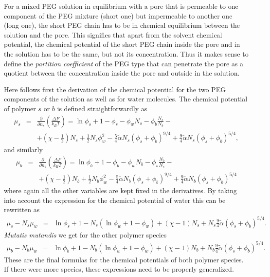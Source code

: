 \documentclass[11pt,a4paper]{article}
\begin{document}
For a mixed PEG solution in equilibrium with a pore that is permeable to one component of the PEG mixture (short one) but impermeable to another one (long one), the short PEG chain has to be in chemical equilibrium between the solution and the pore. This signifies that apart from the solvent chemical potential, the chemical potential of the short PEG chain inside the pore and in the solution has to be the same, but not its concentration. Thus it makes sense to define the {\sl partition coefficient} of the PEG type that can penetrate the pore as a quotient between the concentration inside the pore and outside in the solution.

Here follows first the derivation of the chemical potential for the two PEG components of the solution as well as for water molecules.
The chemical potential of polymer $s$ or $b$ is defined straightforwardly as
\begin{eqnarray}
\mu_{s} &=& \frac{\partial }{\partial n_{s} } \left( \frac{\Delta F}{k_B T}\right)  =  \ln{\phi_{s}} + 1 - \phi_{s} - \phi_w N_{s} - \phi_b \frac{N_s}{N_b} - \nonumber\\
& &+ (\chi - {\textstyle\frac12}) N_s + {\textstyle\frac12}N_s \phi_w^2  -  {\textstyle\frac{5}{4}} \tilde\alpha N_s \left( \phi_s + \phi_b\right)^{9/4}  +  \frac{9}{4} \tilde\alpha N_s \left( \phi_s + \phi_b\right)^{5/4}  ,
\label{mu1}
\end{eqnarray}
and similarly
\begin{eqnarray}
\mu_{b} &=& \frac{\partial }{\partial n_{b} } \left( \frac{\Delta F}{k_B T}\right)  =  \ln{\phi_{b}} + 1 - \phi_{b} - \phi_w N_{b} - \phi_s \frac{N_b}{N_s} - \nonumber\\
& & + (\chi - {\textstyle\frac12}) N_b + {\textstyle\frac12}N_b \phi_w^2 - {\textstyle\frac{5}{4}} \tilde\alpha N_b \left( \phi_s + \phi_b\right)^{9/4}  +  \frac{9}{4} \tilde\alpha N_b \left( \phi_s + \phi_b\right)^{5/4} 
\label{mu2}
\end{eqnarray}
where again all the other variables are kept fixed in the derivatives. By taking into account the expression for the chemical potential of water this can be rewritten as
\begin{eqnarray}
\mu_{s} - N_s \mu_w &=&  \ln{\phi_{s}} + 1 - N_s (\ln{\phi_w} +1 - \phi_w) + (\chi - 1) N_s + N_s \frac{9}{4} \tilde\alpha \left( \phi_s + \phi_b\right)^{5/4}.
\label{ghjferw2}
\end{eqnarray}
{\sl Mutatis mutandis} we get for the other polymer species 
\begin{eqnarray}
\mu_{b} - N_b \mu_w &=&  \ln{\phi_{b}} + 1 - N_b (\ln{\phi_w} +1 - \phi_w) + (\chi - 1) N_b + N_b \frac{9}{4} \tilde\alpha \left( \phi_s + \phi_b\right)^{5/4} .
\label{ghjferw3}
\end{eqnarray}
These are the final formulas for the chemical potentials of both polymer species. If there were more species, these expressions need to be properly generalized.
\end{document}
